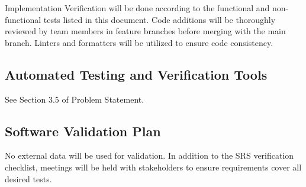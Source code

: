 \documentclass[12pt, titlepage]{article}
\begin{document}
	

	Implementation Verification will be done according to the functional and non-functional tests listed in this document.
	Code additions will be thoroughly reviewed by team members in feature branches before merging with the main branch.
	Linters and formatters will be utilized to ensure code consistency.
	
	\subsection{Automated Testing and Verification Tools}
	
	See Section 3.5 of Problem Statement.
	
	\subsection{Software Validation Plan}
	No external data will be used for validation. In addition to the SRS verification checklist, meetings will be held with stakeholders to ensure
	requirements cover all desired tests.
\end{document}
